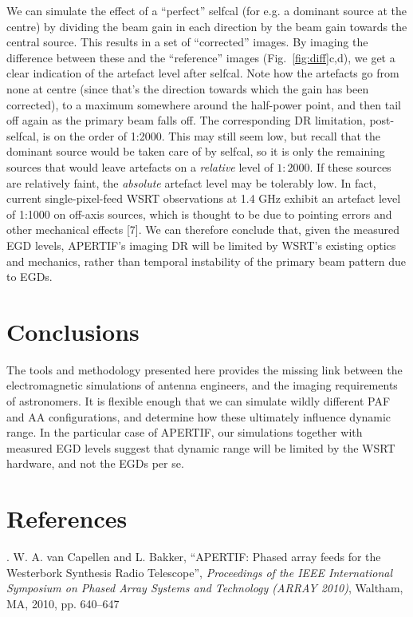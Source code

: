 \documentclass{aps2010} \special{papersize=8.5in,11in}
\begin{document}
We can simulate the effect of a ``perfect'' selfcal (for e.g. a dominant source at the centre) by dividing the beam gain in each direction by the beam gain towards the central source. This results in a set of ``corrected'' images. By imaging the difference between these and the ``reference'' images (Fig.~\ref{fig:diff}c,d), we get a clear indication of the artefact level after selfcal. Note how the artefacts go from none at centre (since that's the direction towards which the gain has been corrected), to a maximum somewhere around the half-power point, and then tail off again as the primary beam falls off. The corresponding DR limitation, post-selfcal, is on the order of 1:2000. This may still seem low, but recall that the dominant source would be taken care of by selfcal, so it is only the remaining sources that would leave artefacts on a \emph{relative} level of $1:2000$. If these sources are relatively faint, the \emph{absolute} artefact level may be tolerably low. In fact, current single-pixel-feed WSRT observations at 1.4 GHz exhibit an artefact level of 1:1000 on off-axis sources, which is thought to be due to pointing errors and other mechanical effects [7]. We can therefore conclude that, given the measured EGD levels, APERTIF's imaging DR will be limited by WSRT's existing optics and mechanics, rather than temporal instability of the primary beam pattern due to EGDs.

\section{Conclusions}

The tools and methodology presented here provides the missing link between the electromagnetic simulations of antenna engineers, and the  imaging requirements of astronomers. It is flexible enough that we can simulate wildly different PAF and AA configurations, and determine how these ultimately influence dynamic range. In the particular case of APERTIF, our simulations together with measured EGD levels suggest that dynamic range will be limited by the WSRT hardware, and not the EGDs per se. 

\section{References}

. W. A. van Capellen and L. Bakker, ``APERTIF: Phased array feeds for the Westerbork Synthesis Radio Telescope'', \emph{Proceedings of the IEEE International Symposium on Phased Array Systems and Technology (ARRAY 2010)}, Waltham, MA, 2010, pp. 640--647
\end{document}
